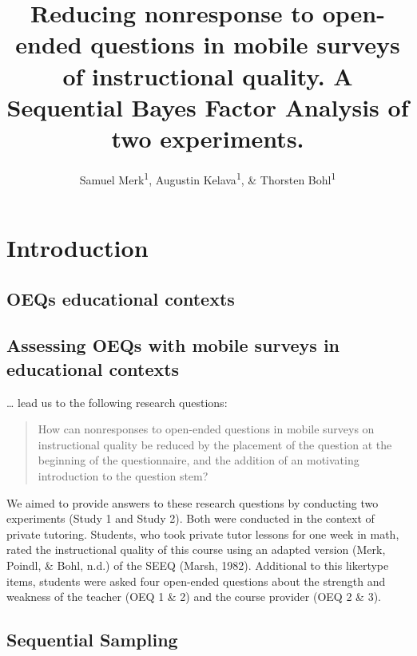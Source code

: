 \documentclass[man]{apa6}
\title{Reducing nonresponse to open-ended questions in mobile surveys of instructional quality. A Sequential Bayes Factor Analysis of two experiments.}
\author{Samuel Merk\textsuperscript{1}, Augustin Kelava\textsuperscript{1}, \& Thorsten Bohl\textsuperscript{1}}
\date{}
\affiliation{
\vspace{0.5cm}
\textsuperscript{1} Eberhard Karls Universität Tübingen}
\begin{document}
\maketitle

\hypertarget{introduction}{%
\section{Introduction}\label{introduction}}

\hypertarget{oeqs-educational-contexts}{%
\subsection{OEQs educational contexts}\label{oeqs-educational-contexts}}

\hypertarget{assessing-oeqs-with-mobile-surveys-in-educational-contexts}{%
\subsection{Assessing OEQs with mobile surveys in educational contexts}\label{assessing-oeqs-with-mobile-surveys-in-educational-contexts}}

\ldots{} lead us to the following research questions:

\begin{quote}
How can nonresponses to open-ended questions in mobile surveys on instructional quality be reduced by the placement of the question at the beginning of the questionnaire, and the addition of an motivating introduction to the question stem?
\end{quote}

We aimed to provide answers to these research questions by conducting two experiments (Study 1 and Study 2). Both were conducted in the context of private tutoring. Students, who took private tutor lessons for one week in math, rated the instructional quality of this course using an adapted version (Merk, Poindl, \& Bohl, n.d.) of the SEEQ (Marsh, 1982). Additional to this likertype items, students were asked four open-ended questions about the strength and weakness of the teacher (OEQ 1 \& 2) and the course provider (OEQ 2 \& 3).

\hypertarget{sequential-sampling}{%
\subsection{Sequential Sampling}\label{sequential-sampling}}
\end{document}

